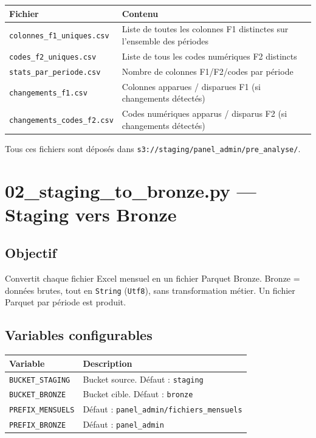 \documentclass[12pt,a4paper,french]{report}
\newcommand{\bucket}[1]{\texttt{s3://#1}}
\begin{document}
\begin{tabularx}{\textwidth}{lX}
  \toprule
  \textbf{Fichier} & \textbf{Contenu} \\
  \midrule
  \texttt{colonnes\_f1\_uniques.csv} & Liste de toutes les colonnes F1
    distinctes sur l'ensemble des périodes \\
  \texttt{codes\_f2\_uniques.csv} & Liste de tous les codes numériques F2
    distincts \\
  \texttt{stats\_par\_periode.csv} & Nombre de colonnes F1/F2/codes par
    période \\
  \texttt{changements\_f1.csv} & Colonnes apparues / disparues F1
    (si changements détectés) \\
  \texttt{changements\_codes\_f2.csv} & Codes numériques apparus / disparus F2
    (si changements détectés) \\
  \bottomrule
\end{tabularx}

Tous ces fichiers sont déposés dans
\bucket{staging/panel\_admin/pre\_analyse/}.

\section{02\_staging\_to\_bronze.py — Staging vers Bronze}

\subsection{Objectif}

Convertit chaque fichier Excel mensuel en un fichier Parquet Bronze. Bronze =
données brutes, tout en \texttt{String} (\texttt{Utf8}), sans transformation
métier. Un fichier Parquet par période est produit.

\subsection{Variables configurables}

\begin{tabularx}{\textwidth}{lX}
  \toprule
  \textbf{Variable} & \textbf{Description} \\
  \midrule
  \texttt{BUCKET\_STAGING} & Bucket source. Défaut : \texttt{staging} \\
  \texttt{BUCKET\_BRONZE} & Bucket cible. Défaut : \texttt{bronze} \\
  \texttt{PREFIX\_MENSUELS} &
    Défaut : \texttt{panel\_admin/fichiers\_mensuels} \\
  \texttt{PREFIX\_BRONZE} & Défaut : \texttt{panel\_admin} \\
  \bottomrule
\end{tabularx}
\end{document}
